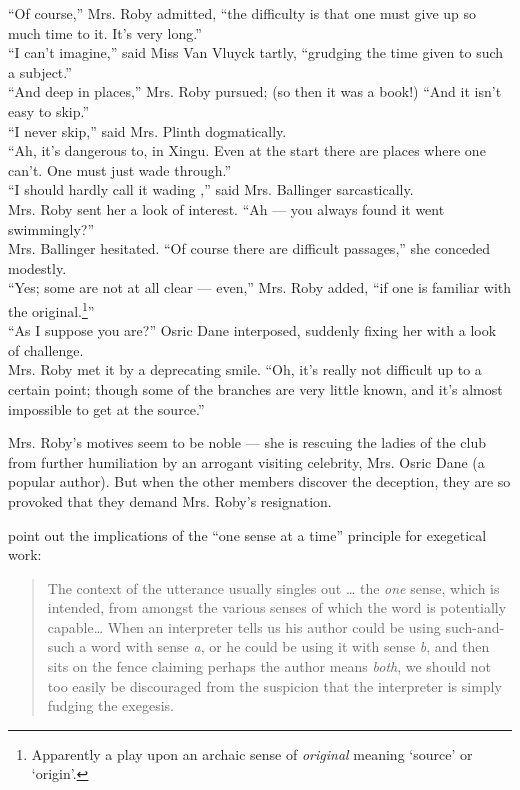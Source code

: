\ea \label{ex:5.17}
“Of course,” Mrs. Roby admitted, “the difficulty is that one must give up so much time to it. It’s very long.”\\
“I can’t imagine,” said Miss Van Vluyck tartly, “grudging the time given to such a subject.”\\
“And deep in places,” Mrs. Roby pursued; (so then it was a book!) “And it isn’t easy to skip.”\\
“I never skip,” said Mrs. Plinth dogmatically.\\
“Ah, it’s dangerous to, in Xingu. Even at the start there are places where one can’t. One must just wade through.”\\
“I should hardly call it wading ,” said Mrs. Ballinger sarcastically.\\
Mrs. Roby sent her a look of interest. “Ah — you always found it went swimmingly?”\\
Mrs. Ballinger hesitated. “Of course there are difficult passages,” she conceded modestly.\\
“Yes; some are not at all clear — even,” Mrs. Roby added, “if one is familiar with the original.\footnote{Apparently a play upon an archaic sense of \textit{original} meaning ‘source’ or ‘origin’.}”\\
“As I suppose you are?” Osric Dane interposed, suddenly fixing her with a look of challenge.\\
Mrs. Roby met it by a deprecating smile. “Oh, it’s really not difficult up to a certain point; though some of the branches are very little known, and it’s almost impossible to get at the source.”
\z

Mrs. Roby’s motives seem to be noble — she is rescuing the ladies of the club from further humiliation by an arrogant visiting celebrity, Mrs. Osric Dane (a popular author). But when the other members discover the deception, they are so provoked that they demand Mrs. Roby’s resignation.

\citet[175]{CotterellTurner1989} point out the implications of the “one sense at a time” principle for exegetical work:

\begin{quote}
The context of the utterance usually singles out … the \textit{one} sense, which is intended, from amongst the various senses of which the word is potentially capable…  When an interpreter tells us his author could be using such-and-such a word with sense \textit{a}, or he could be using it with sense \textit{b}, and then sits on the fence claiming perhaps the author means \textit{both}, we should not too easily be discouraged from the suspicion that the interpreter is simply fudging the exegesis.
\end{quote}


